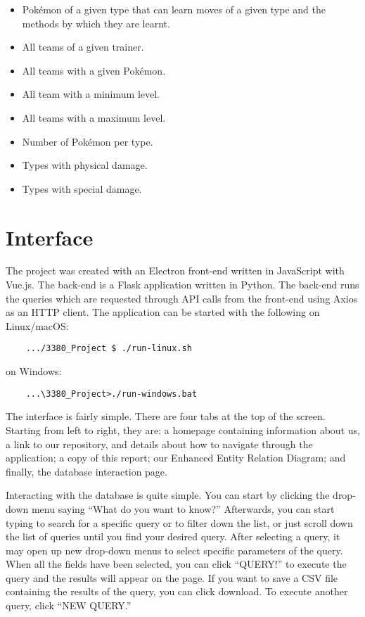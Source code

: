 \documentclass{article}
\begin{document}
\begin{itemize}
    \item Pok\'emon of a given type that can learn moves of a given type and the methods by which
        they are learnt.
    \item All teams of a given trainer.
    \item All teams with a given Pok\'emon.
    \item All team with a minimum level.
    \item All teams with a maximum level.
    \item Number of Pok\'emon per type.
    \item Types with physical damage.
    \item Types with special damage.
\end{itemize}

\section{Interface}
The project was created with an Electron front-end written in JavaScript with Vue.js. The back-end
is a Flask application written in Python. The back-end runs the queries which are requested 
through API calls from the front-end using Axios as an HTTP client. 
The application can be started with the following on Linux/macOS:
\begin{verbatim}
    .../3380_Project $ ./run-linux.sh
\end{verbatim}
on Windows:
\begin{verbatim}
    ...\3380_Project>./run-windows.bat
\end{verbatim}

The interface is fairly simple. There are four tabs at the top of the screen. Starting from left
to right, they are: a homepage containing information about us, a link to our repository, and
details about how to navigate through the application; a copy of this report; our 
Enhanced Entity Relation Diagram; and finally, the database interaction page.

Interacting with the database is quite simple. You can start by clicking the drop-down menu saying
``What do you want to know?'' Afterwards, you can start typing to search for a specific query or 
to filter down the list, or just scroll down the list of queries until you find your desired 
query. After selecting a query, it may open up new drop-down menus to select specific parameters
of the query. When all the fields have been selected, you can click ``QUERY!'' to execute the 
query and the results will appear on the page. 
If you want to save a CSV file containing the results of the query, you can click download. To 
execute another query, click ``NEW QUERY.''
\end{document}
